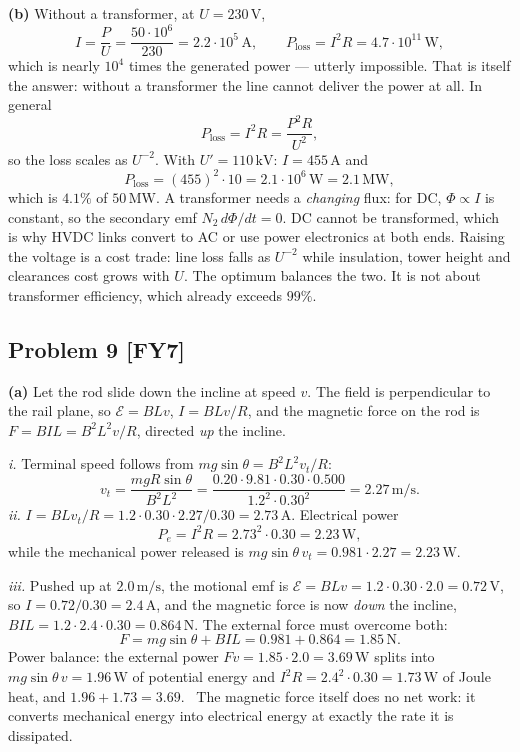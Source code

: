 \documentclass[11pt,a4paper]{article}
\newcommand{\problem}[2]{\subsection*{Problem #1 \; \textnormal{\small[#2]}}}
\newcommand{\unit}[1]{\,\mathrm{#1}}
\begin{document}
\textbf{(b)} Without a transformer, at $U=230\unit{V}$,
\[
  I=\frac{P}{U}=\frac{50\cdot10^{6}}{230}=2.2\cdot10^{5}\unit{A},\qquad
  P_{\text{loss}}=I^2R=\boxed{4.7\cdot10^{11}\unit{W}},
\]
which is nearly $10^{4}$ times the generated power --- utterly impossible.
That is itself the answer: without a transformer the line cannot deliver
the power at all. In general
\[
  P_{\text{loss}}=I^2R=\frac{P^2R}{U^2},
\]
so the loss scales as $U^{-2}$.
With $U'=110\unit{kV}$: $I=455\unit{A}$ and
\[
  P_{\text{loss}}=(455)^2\cdot10=\boxed{2.1\cdot10^{6}\unit{W}
  =2.1\unit{MW}},
\]
which is $\boxed{4.1\%}$ of $50\unit{MW}$. A transformer needs a
\emph{changing} flux: for DC, $\Phi\propto I$ is constant, so the secondary
emf $N_2\,d\Phi/dt=0$. DC cannot be transformed, which is why HVDC links
convert to AC or use power electronics at both ends. Raising the voltage
is a cost trade: line loss falls as $U^{-2}$ while insulation, tower height
and clearances cost grows with $U$. The optimum balances the two. It is not
about transformer efficiency, which already exceeds $99\%$.

\problem{9}{FY7}
\textbf{(a)} Let the rod slide down the incline at speed $v$. The field is
perpendicular to the rail plane, so
$\mathcal{E}=BLv$, $I=BLv/R$, and the magnetic force on the rod is
$F=BIL=B^2L^2v/R$, directed \emph{up} the incline.

\emph{i.} Terminal speed follows from $mg\sin\theta=B^2L^2v_t/R$:
\[
  v_t=\frac{mgR\sin\theta}{B^2L^2}
  =\frac{0.20\cdot9.81\cdot0.30\cdot0.500}{1.2^2\cdot0.30^2}
  =\boxed{2.27\unit{m/s}} .
\]
\emph{ii.}
$I=BLv_t/R=1.2\cdot0.30\cdot2.27/0.30=\boxed{2.73\unit{A}}$. Electrical
power
\[
  P_e=I^2R=2.73^2\cdot0.30=\boxed{2.23\unit{W}},
\]
while the mechanical power released is
$mg\sin\theta\,v_t=0.981\cdot2.27=2.23\unit{W}$. \checkmark

\emph{iii.} Pushed up at $2.0\unit{m/s}$, the motional emf is
$\mathcal{E}=BLv=1.2\cdot0.30\cdot2.0=0.72\unit{V}$, so
$I=0.72/0.30=\boxed{2.4\unit{A}}$, and the magnetic force is now
\emph{down} the incline, $BIL=1.2\cdot2.4\cdot0.30=0.864\unit{N}$. The
external force must overcome both:
\[
  F=mg\sin\theta+BIL=0.981+0.864=\boxed{1.85\unit{N}} .
\]
Power balance: the external power $Fv=1.85\cdot2.0=3.69\unit{W}$ splits
into $mg\sin\theta\,v=1.96\unit{W}$ of potential energy and
$I^2R=2.4^2\cdot0.30=1.73\unit{W}$ of Joule heat, and $1.96+1.73=3.69$.
\checkmark\ The magnetic force itself does no net work: it converts
mechanical energy into electrical energy at exactly the rate it is
dissipated.
\end{document}

